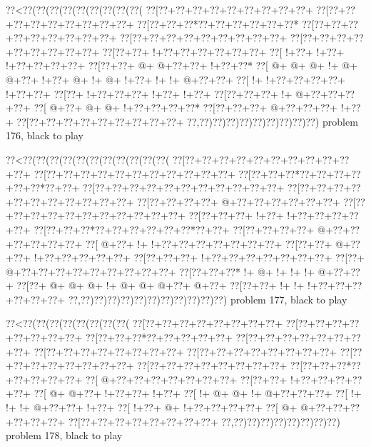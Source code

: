 \vbox{\vbox{\goo
\0??<\0??(\0??(\0??(\0??(\0??(\0??(\0??(\0??(\0??(
\0??[\0??+\0??+\0??+\0??+\0??+\0??+\0??+\0??+\0??+
\0??[\0??+\0??+\0??+\0??+\0??+\0??+\0??+\0??+\0??+
\0??[\0??+\0??+\0??*\0??+\0??+\0??+\0??+\0??+\0??*
\0??[\0??+\0??+\0??+\0??+\0??+\0??+\0??+\0??+\0??+
\0??[\0??+\0??+\0??+\0??+\0??+\0??+\0??+\0??+\0??+
\0??[\0??+\0??+\0??+\0??+\0??+\0??+\0??+\0??+\0??+
\0??[\0??+\0??+\- !+\0??+\0??+\0??+\0??+\0??+\0??+
\0??[\- !+\0??+\- !+\0??+\- !+\0??+\0??+\0??+\0??+
\0??[\0??+\0??+\- @+\- @+\0??+\0??+\- !+\0??+\0??*
\0??[\- @+\- @+\- @+\- !+\- @+\- @+\0??+\- !+\0??+
\- @+\- !+\- @+\- !+\0??+\- !+\- !+\- @+\0??+\0??+
\0??[\- !+\- !+\0??+\0??+\0??+\0??+\- !+\0??+\0??+
\0??[\0??+\- !+\0??+\0??+\0??+\- !+\0??+\- !+\0??+
\0??[\0??+\0??+\0??+\- !+\- @+\0??+\0??+\0??+\0??+
\0??[\- @+\0??+\- @+\- @+\- !+\0??+\0??+\0??+\0??*
\0??[\0??+\0??+\0??+\- @+\0??+\0??+\0??+\- !+\0??+
\0??[\0??+\0??+\0??+\0??+\0??+\0??+\0??+\0??+\0??+
\0??,\0??)\0??)\0??)\0??)\0??)\0??)\0??)\0??)\0??)
}
\hfil problem 176, black to play\hfil\break
}

\vbox{\vbox{\goo
\0??<\0??(\0??(\0??(\0??(\0??(\0??(\0??(\0??(\0??(\0??(\0??(
\0??[\0??+\0??+\0??+\0??+\0??+\0??+\0??+\0??+\0??+\0??+\0??+
\0??[\0??+\0??+\0??+\0??+\0??+\0??+\0??+\0??+\0??+\0??+\0??+
\0??[\0??+\0??+\0??*\0??+\0??+\0??+\0??+\0??+\0??*\0??+\0??+
\0??[\0??+\0??+\0??+\0??+\0??+\0??+\0??+\0??+\0??+\0??+\0??+
\0??[\0??+\0??+\0??+\0??+\0??+\0??+\0??+\0??+\0??+\0??+\0??+
\0??[\0??+\0??+\0??+\0??+\- @+\0??+\0??+\0??+\0??+\0??+\0??+
\0??[\0??+\0??+\0??+\0??+\0??+\0??+\0??+\0??+\0??+\0??+\0??+
\0??[\0??+\0??+\0??+\- !+\0??+\- !+\0??+\0??+\0??+\0??+\0??+
\0??[\0??+\0??+\0??*\0??+\0??+\0??+\0??+\0??+\0??*\0??+\0??+
\0??[\0??+\0??+\0??+\0??+\- @+\0??+\0??+\0??+\0??+\0??+\0??+
\0??[\- @+\0??+\- !+\- !+\0??+\0??+\0??+\0??+\0??+\0??+\0??+
\0??[\0??+\0??+\- @+\0??+\0??+\- !+\0??+\0??+\0??+\0??+\0??+
\0??[\0??+\0??+\0??+\- !+\0??+\0??+\0??+\0??+\0??+\0??+\0??+
\0??[\0??+\- @+\0??+\0??+\0??+\0??+\0??+\0??+\0??+\0??+\0??+
\0??[\0??+\0??+\0??*\- !+\- @+\- !+\- !+\- !+\- @+\0??+\0??+
\0??[\0??+\- @+\- @+\- @+\- !+\- @+\- @+\- @+\0??+\- @+\0??+
\0??[\0??+\0??+\- !+\- !+\- !+\0??+\0??+\0??+\0??+\0??+\0??+
\0??,\0??)\0??)\0??)\0??)\0??)\0??)\0??)\0??)\0??)\0??)\0??)
}
\hfil problem 177, black to play\hfil\break
}

\vbox{\vbox{\goo
\0??<\0??(\0??(\0??(\0??(\0??(\0??(\0??(\0??(
\0??[\0??+\0??+\0??+\0??+\0??+\0??+\0??+\0??+
\0??[\0??+\0??+\0??+\0??+\0??+\0??+\0??+\0??+
\0??[\0??+\0??+\0??*\0??+\0??+\0??+\0??+\0??+
\0??[\0??+\0??+\0??+\0??+\0??+\0??+\0??+\0??+
\0??[\0??+\0??+\0??+\0??+\0??+\0??+\0??+\0??+
\0??[\0??+\0??+\0??+\0??+\0??+\0??+\0??+\0??+
\0??[\0??+\0??+\0??+\0??+\0??+\0??+\0??+\0??+
\0??[\0??+\0??+\0??+\0??+\0??+\0??+\0??+\0??+
\0??[\0??+\0??+\0??*\0??+\0??+\0??+\0??+\0??+
\0??[\- @+\0??+\0??+\0??+\0??+\0??+\0??+\0??+
\0??[\0??+\0??+\- !+\0??+\0??+\0??+\0??+\0??+
\0??[\- @+\- @+\0??+\- !+\0??+\0??+\- !+\0??+
\0??[\- !+\- @+\- @+\- !+\- @+\0??+\0??+\0??+
\0??[\- !+\- !+\- !+\- @+\0??+\0??+\- !+\0??+
\0??[\- !+\0??+\- @+\- !+\0??+\0??+\0??+\0??+
\0??[\- @+\- @+\0??+\0??+\0??+\0??+\0??+\0??+
\0??[\0??+\0??+\0??+\0??+\0??+\0??+\0??+\0??+
\0??,\0??)\0??)\0??)\0??)\0??)\0??)\0??)\0??)
}
\hfil problem 178, black to play\hfil\break
}

